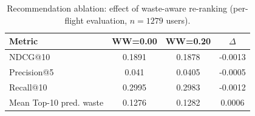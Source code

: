 \begin{table}[t]
\centering
\caption{Recommendation ablation: effect of waste-aware re-ranking (per-flight evaluation, $n=1279$ users).}
\label{tab:exp1_ablation}
\begin{tabular}{lccc}
\hline
Metric & WW=0.00 & WW=0.20 & $\Delta$ \\
\hline
NDCG@10 & 0.1891 & 0.1878 & -0.0013 \\
Precision@5 & 0.041 & 0.0405 & -0.0005 \\
Recall@10 & 0.2995 & 0.2983 & -0.0012 \\
Mean Top-10 pred. waste & 0.1276 & 0.1282 & 0.0006 \\
\hline
\end{tabular}
\end{table}
